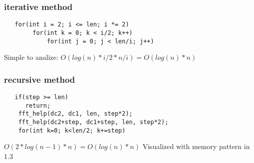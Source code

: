 \subsubsection{iterative method}
\begin{lstlisting}
   for(int i = 2; i <= len; i *= 2)
        for(int k = 0; k < i/2; k++)
            for(int j = 0; j < len/i; j++)

\end{lstlisting}
Simple to analize:
\begin{math}
O(log(n) * i/2 * n/i) = O(log(n)*n)
\end{math}
\subsubsection{recursive method}
\begin{lstlisting}
   if(step >= len)
      return;
    fft_help(dc2, dc1, len, step*2);
    fft_help(dc2+step, dc1+step, len, step*2);
    for(int k=0; k<len/2; k+=step)
\end{lstlisting}
\begin{math}
O(2*log(n-1) * n) = O(log(n)*n)
\end{math}
Visualized with memory pattern in 1.3